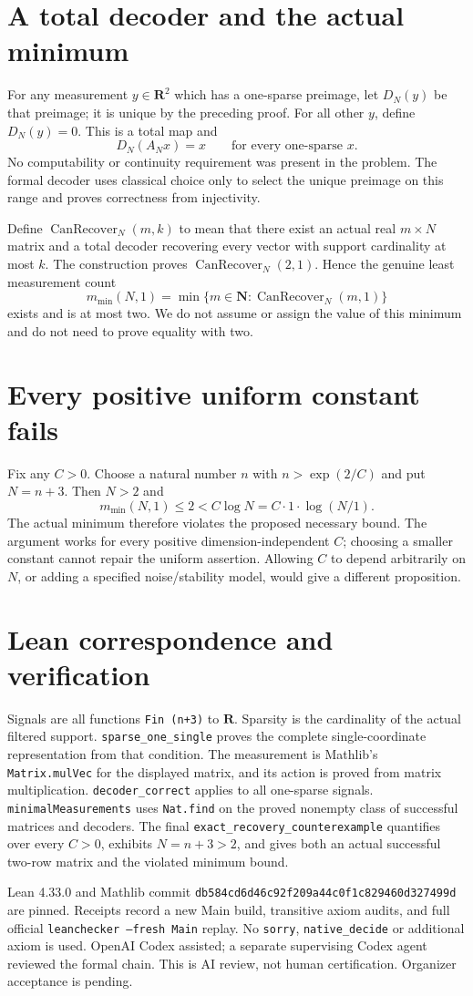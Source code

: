 \documentclass[11pt]{article}
\begin{document}
\newpage
\section{A total decoder and the actual minimum}
For any measurement $y\in\mathbf R^2$ which has a one-sparse preimage,
let $D_N(y)$ be that preimage; it is unique by the preceding proof.
For all other $y$, define $D_N(y)=0$. This is a total map and
\[
 D_N(A_Nx)=x\qquad\text{for every one-sparse }x.
\]
No computability or continuity requirement was present in the problem.
The formal decoder uses classical choice only to select the unique
preimage on this range and proves correctness from injectivity.

Define $\operatorname{CanRecover}_N(m,k)$ to mean that there exist
an actual real $m\times N$ matrix and a total decoder recovering
every vector with support cardinality at most $k$. The construction
proves $\operatorname{CanRecover}_N(2,1)$. Hence the genuine least
measurement count
\[
 m_{\min}(N,1)=\min\{m\in\mathbf N:
                \operatorname{CanRecover}_N(m,1)\}
\]
exists and is at most two. We do not assume or assign the value of
this minimum and do not need to prove equality with two.

\section{Every positive uniform constant fails}
Fix any $C>0$. Choose a natural number $n$ with
$n>\exp(2/C)$ and put $N=n+3$. Then $N>2$ and
\[
 m_{\min}(N,1)\le2<C\log N
   =C\cdot1\cdot\log(N/1).
\]
The actual minimum therefore violates the proposed necessary bound.
The argument works for every positive dimension-independent $C$;
choosing a smaller constant cannot repair the uniform assertion.
Allowing $C$ to depend arbitrarily on $N$, or adding a specified
noise/stability model, would give a different proposition.

\section{Lean correspondence and verification}
Signals are all functions \texttt{Fin (n+3)} to $\mathbf R$.
Sparsity is the cardinality of the actual filtered support.
\texttt{sparse\_one\_single} proves the complete single-coordinate
representation from that condition. The measurement is Mathlib's
\texttt{Matrix.mulVec} for the displayed matrix, and its action is
proved from matrix multiplication. \texttt{decoder\_correct} applies
to all one-sparse signals. \texttt{minimalMeasurements} uses
\texttt{Nat.find} on the proved nonempty class of successful matrices
and decoders. The final \texttt{exact\_recovery\_counterexample}
quantifies over every $C>0$, exhibits $N=n+3>2$, and gives both an
actual successful two-row matrix and the violated minimum bound.

Lean 4.33.0 and Mathlib commit
\texttt{db584cd6d46c92f209a44c0f1c829460d327499d} are pinned.
Receipts record a new Main build, transitive axiom audits, and full
official \texttt{leanchecker --fresh Main} replay.
No \texttt{sorry}, \texttt{native\_decide} or additional axiom is used.
OpenAI Codex assisted; a separate supervising Codex agent reviewed
the formal chain. This is AI review, not human certification.
Organizer acceptance is pending.
\end{document}
